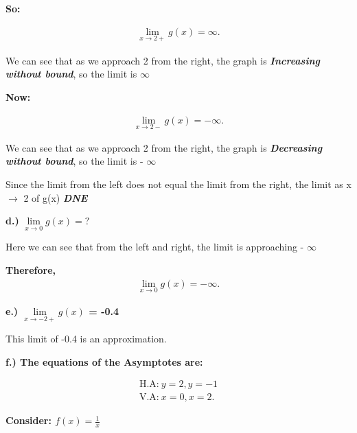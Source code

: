 \documentclass{report}
\begin{document}
        \bigbreak \noindent 
        \textbf{So:}

        \begin{align*}
            \lim\limits_{x \to 2+ }{g(x)} = \infty
        .\end{align*}

        \bigbreak \noindent 
        We can see that as we approach 2 from the right, the graph is
        \textbf{\textit{Increasing without bound}}, so the limit is $\infty$

        \bigbreak \noindent 
        \textbf{Now:}

        \begin{align*}
            \lim\limits_{x \to 2-}{g(x)} = - \infty
        .\end{align*}

        \bigbreak \noindent 
        We can see that as we approach 2 from the right, the graph is
        \textbf{\textit{Decreasing without bound}}, so the limit is - $\infty$

        \bigbreak \noindent 
        Since the limit from the left does not equal the limit from the right, 
        the limit as x $\rightarrow$ 2 of g(x) \textbf{\textit{DNE}}

        \bigbreak \noindent \bigbreak \noindent 
        \textbf{d.)} $\lim\limits_{x \to 0}{g(x)} = ? $

        \bigbreak \noindent 
        Here we can see that from the left and right, the limit is approaching - $\infty$

        \bigbreak \noindent 
        \textbf{Therefore,}
        \begin{align*}
           \lim\limits_{x \to 0}{g(x) = - \infty} 
        .\end{align*}

        \bigbreak \noindent \bigbreak \noindent 
        \textbf{e.) $\lim\limits_{x \to -2+}{g(x)}$ = -0.4}

        \bigbreak \noindent 
        This limit of -0.4 is an approximation.

        \bigbreak \noindent  \bigbreak \noindent 
        \textbf{f.) The equations of the Asymptotes are:}

        \begin{align*}
            \text{H.A:}\ y = 2, y = -1 \\
            \text{V.A:}\ x = 0, x = 2
        .\end{align*}

        \pagebreak \bigbreak \noindent
        \begin{large}
            \textbf{Consider: $f(x) = \frac{1}{x}$}
        \end{large}
\end{document}
